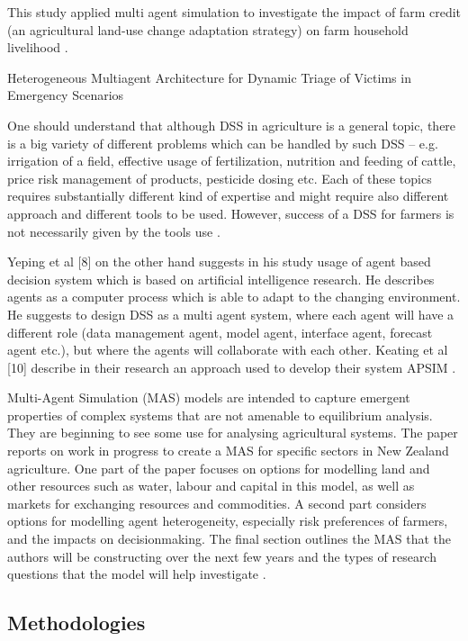 \documentclass[letterpaper, 10 pt, conference]{ieeeconf}  %
\begin{document}
This study applied multi agent simulation to investigate the impact of farm credit (an agricultural land-use change adaptation strategy) on farm household livelihood \cite{Tolk}.

Heterogeneous Multiagent Architecture for Dynamic Triage of Victims in Emergency Scenarios \cite{Mercadal2011}


One should understand that although DSS in agriculture is a general topic, there is a big variety of different problems which can be handled by such DSS – e.g. irrigation of a field, effective usage of fertilization, nutrition and feeding of cattle, price risk management of products, pesticide dosing etc. Each of these topics requires substantially different kind of expertise and might require also different approach and different tools to be used. However, success of a DSS for farmers is not necessarily given by the tools use \cite{KOvZIvSEK}.

Yeping et al [8] on the other hand suggests in his study usage of agent based decision system which is based on artificial intelligence research. He describes agents as a computer process which is able to adapt to the changing environment. He suggests to design DSS as a multi agent system, where each agent will have a different role (data management agent, model agent, interface agent, forecast agent etc.), but where the agents will collaborate with each other.
Keating et al [10] describe in their research an approach used to develop their system APSIM \cite{KOvZIvSEK}.

Multi-Agent Simulation (MAS) models are intended to capture emergent properties of complex systems that are not amenable to equilibrium analysis. They are beginning to see some use for analysing agricultural systems. The paper reports on work in progress to create a MAS for specific sectors in New Zealand agriculture. One part of the paper focuses on options for modelling land and other resources such as water, labour and capital in this model, as well as markets for exchanging resources and commodities. A second part considers options for modelling agent heterogeneity, especially risk preferences of farmers, and the impacts on decisionmaking. The final section outlines the MAS that the authors will be constructing over the next few years and the types of research questions that the model will help investigate \cite{kaye2009review}.


\subsection{Methodologies}
\end{document}
